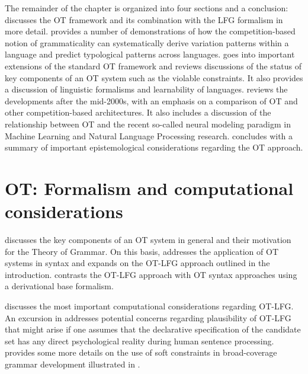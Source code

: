 \documentclass[output=paper,hidelinks]{langscibook}
\begin{document}
The remainder of the chapter is organized into four sections and a conclusion:  discusses the OT framework and its combination with the LFG formalism in more detail.
 provides a number of demonstrations of how the competition-based notion of grammaticality can systematically derive variation patterns within a language and predict typological patterns across languages.
 goes into important extensions of the standard OT framework and reviews discussions of the status of key components of an OT system such as the violable constraints. It also provides a discussion of linguistic formalisms and learnability of languages.
reviews the developments after the mid-2000s, with an emphasis on a comparison of OT and other competition-based architectures. 
It also includes a discussion of the relationship between OT and the recent so-called neural modeling paradigm in Machine Learning and Natural Language Processing research.  
 concludes with a summary of important epistemological considerations regarding the OT approach.

\section{OT: Formalism and computational considerations}
\label{sec:OT:OT-formalism}


 discusses the key components of an OT system in general and their motivation for the Theory of Grammar. On this basis,  addresses the application of OT systems in syntax and expands on the OT-LFG approach outlined in the introduction.
 contrasts the OT-LFG approach with OT syntax approaches using a derivational base formalism.

 discusses the most important computational considerations regarding OT-LFG.
An excursion in  addresses  potential concerns regarding plausibility of OT-LFG that might arise if one assumes that the declarative specification of the candidate set has any direct psychological reality during human sentence processing.
 provides some more details on the use of soft constraints in broad-coverage grammar development illustrated in .
\end{document}
